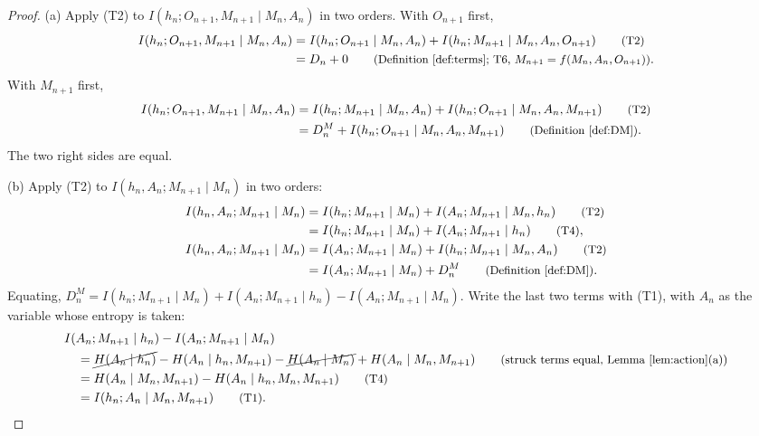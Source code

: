 \documentclass{article}
\theoremstyle{definition}
\theoremstyle{remark}
\newcommand{\why}[1]{\tag*{\small(#1)}}
\begin{document}
\begin{proof}
(a) Apply (T2) to $I(h_n;O_{n+1},M_{n+1}\mid M_n,A_n)$ in two orders. With $O_{n+1}$ first,
\begin{align*}
I(h_n;O_{n+1},M_{n+1}\mid M_n,A_n)&=I(h_n;O_{n+1}\mid M_n,A_n)+I(h_n;M_{n+1}\mid M_n,A_n,O_{n+1}) \why{T2}\\
&=D_n+0 \why{Definition~\ref{def:terms}; T6, $M_{n+1}=f(M_n,A_n,O_{n+1})$}.
\end{align*}
With $M_{n+1}$ first,
\begin{align*}
I(h_n;O_{n+1},M_{n+1}\mid M_n,A_n)&=I(h_n;M_{n+1}\mid M_n,A_n)+I(h_n;O_{n+1}\mid M_n,A_n,M_{n+1}) \why{T2}\\
&=D^M_n+I(h_n;O_{n+1}\mid M_n,A_n,M_{n+1}) \why{Definition~\ref{def:DM}}.
\end{align*}
The two right sides are equal.

(b) Apply (T2) to $I(h_n,A_n;M_{n+1}\mid M_n)$ in two orders:
\begin{align*}
I(h_n,A_n;M_{n+1}\mid M_n)&=I(h_n;M_{n+1}\mid M_n)+I(A_n;M_{n+1}\mid M_n,h_n) \why{T2}\\
&=I(h_n;M_{n+1}\mid M_n)+I(A_n;M_{n+1}\mid h_n) \why{T4},\\
I(h_n,A_n;M_{n+1}\mid M_n)&=I(A_n;M_{n+1}\mid M_n)+I(h_n;M_{n+1}\mid M_n,A_n) \why{T2}\\
&=I(A_n;M_{n+1}\mid M_n)+D^M_n \why{Definition~\ref{def:DM}}.
\end{align*}
Equating, $D^M_n=I(h_n;M_{n+1}\mid M_n)+I(A_n;M_{n+1}\mid h_n)-I(A_n;M_{n+1}\mid M_n)$. Write the last two terms with (T1), with $A_n$ as the variable whose entropy is taken:
\begin{align*}
&I(A_n;M_{n+1}\mid h_n)-I(A_n;M_{n+1}\mid M_n)\\
&\quad=\cancel{H(A_n\mid h_n)}-H(A_n\mid h_n,M_{n+1})-\cancel{H(A_n\mid M_n)}+H(A_n\mid M_n,M_{n+1}) \why{struck terms equal, Lemma~\ref{lem:action}(a)}\\
&\quad=H(A_n\mid M_n,M_{n+1})-H(A_n\mid h_n,M_n,M_{n+1}) \why{T4}\\
&\quad=I(h_n;A_n\mid M_n,M_{n+1}) \why{T1}.
\end{align*}


\end{proof}
\end{document}
